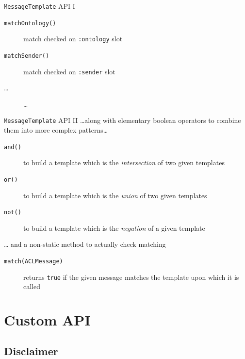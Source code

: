\documentclass{beamer}\mode<presentation>{\usetheme{AMSCesenaPurpleAndGold}}
\begin{document}
\begin{frame}[c,allowframebreaks]
\begin{block}{\texttt{MessageTemplate} API I}
\begin{description}
            \item[\texttt{matchOntology()}] match checked on \texttt{:ontology} slot
            \item[\texttt{matchSender()}] match checked on \texttt{:sender} slot
            \item[\ldots] \ldots
        \end{description}
    \end{block}
    \begin{block}{\texttt{MessageTemplate} API II}
        \ldots along with elementary boolean operators to combine them into more complex patterns\ldots
        \begin{description}
            \item[\texttt{and()}] to build a template which is the \emph{intersection} of two given templates
            \item[\texttt{or()}] to build a template which is the \emph{union} of two given templates
            \item[\texttt{not()}] to build a template which is the \emph{negation} of a given template
        \end{description}
        \ldots{} and a non-static method to actually check matching
        \begin{description}
            \item[\texttt{match(ACLMessage)}] returns \texttt{true} if the given message matches the template upon which it is called
        \end{description}
    \end{block}
\end{frame}

\section{Custom API}

\subsection{Disclaimer}
\end{document}
